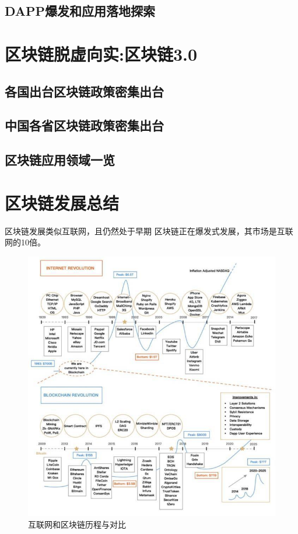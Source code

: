 \documentclass[11pt]{beamer}
\begin{document}
\subsection{DAPP爆发和应用落地探索}

\section{区块链脱虚向实:区块链3.0}\label{sec:}
\subsection{各国出台区块链政策密集出台}
\subsection{中国各省区块链政策密集出台}
\subsection{区块链应用领域一览}

\section{区块链发展总结}

\begin{frame}{区块链发展类似互联网，且仍然处于早期}
	区块链正在爆发式发展，其市场是互联网的10倍。
\begin{figure}
	\centering
	\includegraphics[width=0.8\linewidth,height=0.6\textheight]{figures/blockchainrevelution}
	\caption{互联网和区块链历程与对比}
	\label{fig:blockchainrevelution}
\end{figure}
\end{frame}
\end{document}
